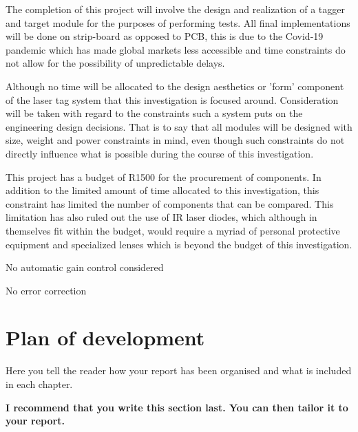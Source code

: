 The completion of this project will involve the design and realization of a tagger and target module for the purposes of performing tests. All final implementations will be done on strip-board as opposed to PCB, this is due to the Covid-19 pandemic which has made global markets less accessible and time constraints do not allow for the possibility of unpredictable delays.

Although no time will be allocated to the design aesthetics or 'form' component of the laser tag system that this investigation is focused around. Consideration will be taken with regard to the constraints such a system puts on the engineering design decisions. That is to say that all modules will be designed with size, weight and power constraints in mind, even though such constraints do not directly influence what is possible during the course of this investigation.

This project has a budget of R1500 for the procurement of components. In addition to the limited amount of time allocated to this investigation, this constraint has limited the number of components that can be compared. This limitation has also ruled out the use of IR laser diodes, which although in themselves fit within the budget, would require a myriad of personal protective equipment and specialized lenses which is beyond the budget of this investigation.

No automatic gain control considered

No error correction





\section{Plan of development}
Here you tell the reader how your report has been organised and what is included in each
chapter.

{\bf I recommend that you write this section last. You can then tailor it to your report.}
